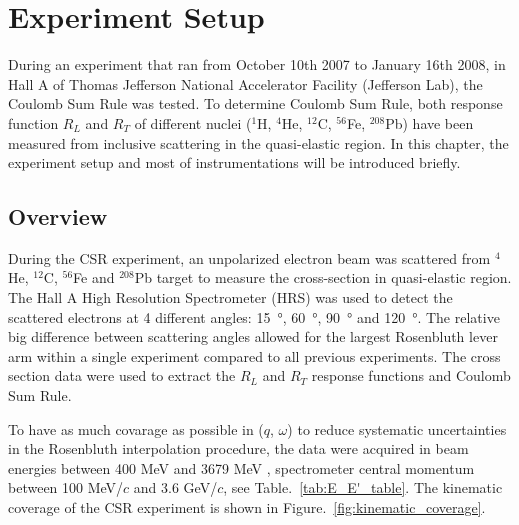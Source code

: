 


\chapter{Experiment Setup}
\label{Experiement_Setup}

During an experiment that ran from October 10th  2007 to January 16th 2008, in Hall A of Thomas Jefferson National
Accelerator Facility (Jefferson Lab), the Coulomb Sum Rule was tested. To determine Coulomb Sum Rule, both response function $R_L$ and $R_T$ of different nuclei (${}^1$H, ${}^4$He, ${}^{12}$C, ${}^{56}$Fe, ${}^{208}$Pb) have been measured from inclusive scattering in the quasi-elastic region. In this chapter, the experiment setup and most of instrumentations will be introduced briefly. 

\section{Overview}

During the CSR experiment, an unpolarized electron beam was scattered from ${}^4$He, ${}^{12}$C, ${}^{56}$Fe and
${}^{208}$Pb target to measure the cross-section in quasi-elastic region. The Hall A High Resolution Spectrometer (HRS)
was used to detect the scattered electrons at 4 different angles: \SI{15}{\degree}, \SI{60}{\degree}, \SI{90}{\degree} and \SI{120}{\degree}.
The relative big difference between scattering angles allowed for the largest Rosenbluth lever arm within a single experiment compared to all previous experiments.
The cross section data were used to extract the $R_L$ and $R_T$ response functions and Coulomb Sum Rule.

To have as much covarage as possible in ($q$, $\omega$) to reduce systematic uncertainties in the Rosenbluth interpolation procedure,
the data were acquired in beam energies between 400 MeV and 3679 MeV , spectrometer central momentum between 100 MeV/$c$ and
3.6 GeV/$c$, see Table.~\ref{tab:E_E'_table}. The kinematic coverage of the CSR experiment is shown in Figure.~\ref{fig:kinematic_coverage}.

